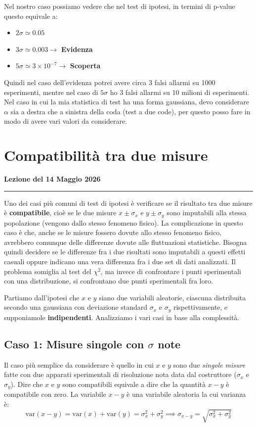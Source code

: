 \documentclass[openany,a4paper,12pt]{book}
\theoremstyle{remark}
\newcommand{\thelezione}{}
\newcommand{\lezione}[2]{
\newpage
\renewcommand{\thelezione}{#2} 
\section{#1} 
\noindent\textbf{\color{RoyalBlue}Lezione del #2}\par\vspace{0.5em}\hrule\vspace{1em}
}
\begin{document}
Nel nostro caso possiamo vedere che nel test di ipotesi, in termini di p-value questo equivale a:
\begin{itemize}
    \item $2\sigma \simeq 0.05$
    \item $3\sigma \simeq 0.003 \longrightarrow$ \textbf{Evidenza}
    \item $5\sigma \simeq 3 \times 10^{-7} \longrightarrow$ \textbf{Scoperta}
\end{itemize}
Quindi nel caso dell'evidenza potrei avere circa 3 falsi allarmi su 1000 esperimenti, mentre nel caso di $5\sigma$ ho 3 falsi allarmi su 10 milioni di esperimenti. 
Nel caso in cui la mia statistica di test ha una forma gaussiana, devo considerare $\alpha$ sia a destra che a sinistra della coda (test a due code), per questo posso fare in modo di avere vari valori da considerare.




\lezione{Compatibilità tra due misure}{14 Maggio 2026}

Uno dei casi più comuni di test di ipotesi è verificare se il risultato tra due misure è \textbf{compatibile}, cioè se le due misure $x \pm \sigma_x$ e $y \pm \sigma_y$ sono imputabili alla stessa popolazione (vengono dallo stesso fenomeno fisico). 
La complicazione in questo caso è che, anche se le misure fossero dovute allo stesso fenomeno fisico, avrebbero comunque delle differenze dovute alle fluttuazioni statistiche. Bisogna quindi decidere se le differenze fra i due risultati sono imputabili a questi effetti casuali oppure indicano una vera differenza fra i due set di dati analizzati. 
Il problema somiglia al test del $\chi^2$, ma invece di confrontare i punti sperimentali con una distribuzione, si confrontano due punti sperimentali fra loro.

Partiamo dall'ipotesi che $x$ e $y$ siano due variabili aleatorie, ciascuna distribuita secondo una gaussiana con deviazione standard $\sigma_x$ e $\sigma_y$ rispettivamente, e supponiamole \textbf{indipendenti}. Analizziamo i vari casi in base alla complessità.

\subsection*{Caso 1: Misure singole con $\sigma$ note}
Il caso più semplice da considerare è quello in cui $x$ e $y$ sono due \textit{singole misure} fatte con due apparati sperimentali di risoluzione nota data dal costruttore ($\sigma_x$ e $\sigma_y$). 
Dire che $x$ e $y$ sono compatibili equivale a dire che la quantità $x-y$ è compatibile con zero.
La variabile $x-y$ è una variabile aleatoria la cui varianza è:
\begin{equation}
    \text{var}(x-y) = \text{var}(x) + \text{var}(y) = \sigma_x^2 + \sigma_y^2 \implies \sigma_{x-y} = \sqrt{\sigma_x^2 + \sigma_y^2}
\end{equation}
\end{document}
